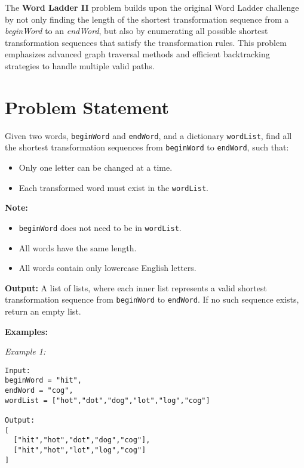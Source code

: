
\label{problem:word_ladder_ii}

The \textbf{Word Ladder II} problem builds upon the original Word Ladder challenge by not only finding the length of the shortest transformation sequence from a \textit{beginWord} to an \textit{endWord}, but also by enumerating all possible shortest transformation sequences that satisfy the transformation rules. This problem emphasizes advanced graph traversal methods and efficient backtracking strategies to handle multiple valid paths.

\section*{Problem Statement}

Given two words, \texttt{beginWord} and \texttt{endWord}, and a dictionary \texttt{wordList}, find all the shortest transformation sequences from \texttt{beginWord} to \texttt{endWord}, such that:

\begin{itemize}
    \item Only one letter can be changed at a time.
    \item Each transformed word must exist in the \texttt{wordList}.
\end{itemize}

\textbf{Note:}
\begin{itemize}
    \item \texttt{beginWord} does not need to be in \texttt{wordList}.
    \item All words have the same length.
    \item All words contain only lowercase English letters.
\end{itemize}

\textbf{Output:} A list of lists, where each inner list represents a valid shortest transformation sequence from \texttt{beginWord} to \texttt{endWord}. If no such sequence exists, return an empty list.

\textbf{Examples:}

\textit{Example 1:}

\begin{verbatim}
Input:
beginWord = "hit",
endWord = "cog",
wordList = ["hot","dot","dog","lot","log","cog"]

Output:
[
  ["hit","hot","dot","dog","cog"],
  ["hit","hot","lot","log","cog"]
]
\end{verbatim}

